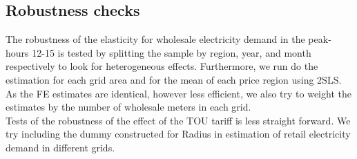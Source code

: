 \subsection{Robustness checks}
\label{subsec:e_robustness}
The robustness of the elasticity for wholesale electricity demand in the peak-hours 12-15 is tested by splitting the sample by region, year, and month respectively to look for heterogeneous effects. Furthermore, we run do the estimation for each grid area and for the mean of each price region using 2SLS. As the FE estimates are identical, however less efficient, we also try to weight the estimates by the number of wholesale meters in each grid.
\medskip\\
Tests of the robustness of the effect of the TOU tariff is less straight forward. We try including the dummy constructed for Radius in estimation of retail electricity demand in different grids.
